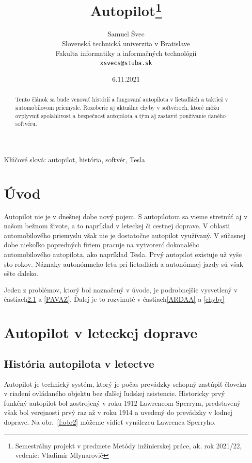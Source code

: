 \documentclass[10pt,twoside,slovak,a4paper]{article}
\title{Autopilot\thanks{Semestrálny projekt v predmete Metódy inžinierskej práce, ak. rok 2021/22, vedenie: Vladimír Mlynarovič}} %
\author{Samuel Švec\\[2pt]
	{\small Slovenská technická univerzita v Bratislave}\\
	{\small Fakulta informatiky a informačných technológií}\\
	{\small \texttt{xsvecs@stuba.sk}}
	}
\date{\small 6.11.2021} %
\begin{document}
\maketitle

\begin{abstract}
Tento článok sa bude venovať histórií a fungovaní autopilota v lietadlách a taktiež v automobilovom priemysle. Rozoberie aj aktuálne chyby v softvéroch, ktoré môžu ovplyvniť spoľahlivosť a bezpečnosť autopilota a tým aj zastaviť používanie daného softvéru.
\end{abstract}

Kľúčové slová: autopilot, história, softvér, Tesla

\section{Úvod}

Autopilot nie je v dnešnej dobe nový pojem. S autopilotom sa vieme stretnúť aj v našom bežnom živote, a to napríklad v leteckej či cestnej doprave. V oblasti automobilového priemyslu však nie je dostatočne autopilot využívaný. V súčasnej dobe niekoľko popredných firiem pracuje na vytvorení dokonalého automobilového autopilota, ako napríklad Tesla. Prvý autopilot existuje už vyše sto rokov. Náznaky autonómneho letu pri lietadlách a autonómnej jazdy sú však ešte ďaleko. 

Jeden z problémov, ktorý bol naznačený v úvode, je podrobnejšie vysvetlený v častiach\ref{ALD} a \ref{PAVAZ}.
Ďalej je to rozvinuté v častiach\ref{ARDAA} a \ref{chyby}


\section{Autopilot v leteckej doprave} 

\subsection{História autopilota v letectve} \label{ALD}

Autopilot je technický systém, ktorý je počas prevádzky schopný zastúpiť človeka v riadení ovládaného objektu bez ďalšej ľudskej asistencie. Historicky prvý funkčný autopilot bol zostrojený v roku 1912 Lawrencom Sperrym, predstavený však bol verejnosti prvý raz až v roku 1914 a uvedený do prevádzky v lodnej doprave.\cite{HistoryAutopilot} Na obr.~\ref{f:obr2} môžeme vidieť vynálezcu Lawrenca Sperryho.
\end{document}
